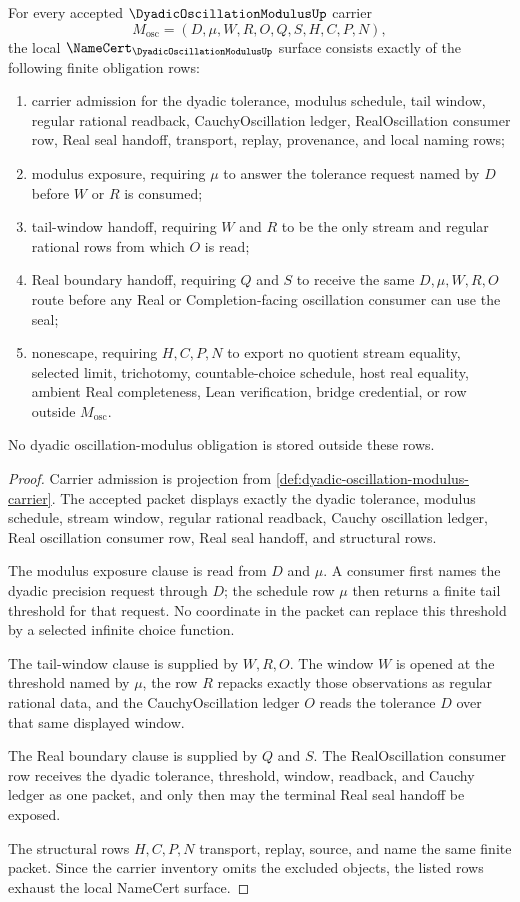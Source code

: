 \begin{theorem}
\label{thm:dyadic-oscillation-modulus-namecert-obligations}
For every accepted $\DyadicOscillationModulusUp$ carrier
$$
M_{\mathrm{osc}}=(D,\mu,W,R,O,Q,S,H,C,P,N),
$$
the local $\NameCert_{\DyadicOscillationModulusUp}$ surface consists exactly of the following finite obligation rows:
\begin{enumerate}
\item carrier admission for the dyadic tolerance, modulus schedule, tail window, regular rational readback, CauchyOscillation ledger, RealOscillation consumer row, Real seal handoff, transport, replay, provenance, and local naming rows;
\item modulus exposure, requiring $\mu$ to answer the tolerance request named by $D$ before $W$ or $R$ is consumed;
\item tail-window handoff, requiring $W$ and $R$ to be the only stream and regular rational rows from which $O$ is read;
\item Real boundary handoff, requiring $Q$ and $S$ to receive the same $D,\mu,W,R,O$ route before any Real or Completion-facing oscillation consumer can use the seal;
\item nonescape, requiring $H,C,P,N$ to export no quotient stream equality, selected limit, trichotomy, countable-choice schedule, host real equality, ambient Real completeness, Lean verification, bridge credential, or row outside $M_{\mathrm{osc}}$.
\end{enumerate}
No dyadic oscillation-modulus obligation is stored outside these rows.
\end{theorem}
\begin{proof}
Carrier admission is projection from \autoref{def:dyadic-oscillation-modulus-carrier}. The accepted packet displays exactly the dyadic tolerance, modulus schedule, stream window, regular rational readback, Cauchy oscillation ledger, Real oscillation consumer row, Real seal handoff, and structural rows.

The modulus exposure clause is read from $D$ and $\mu$. A consumer first names the dyadic precision request through $D$; the schedule row $\mu$ then returns a finite tail threshold for that request. No coordinate in the packet can replace this threshold by a selected infinite choice function.

The tail-window clause is supplied by $W,R,O$. The window $W$ is opened at the threshold named by $\mu$, the row $R$ repacks exactly those observations as regular rational data, and the CauchyOscillation ledger $O$ reads the tolerance $D$ over that same displayed window.

The Real boundary clause is supplied by $Q$ and $S$. The RealOscillation consumer row receives the dyadic tolerance, threshold, window, readback, and Cauchy ledger as one packet, and only then may the terminal Real seal handoff be exposed.

The structural rows $H,C,P,N$ transport, replay, source, and name the same finite packet. Since the carrier inventory omits the excluded objects, the listed rows exhaust the local NameCert surface.
\end{proof}


